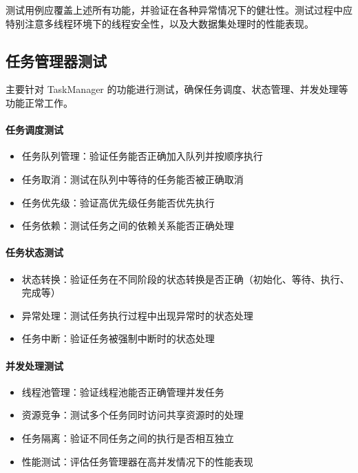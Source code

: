 \documentclass[a4paper,12pt]{report}	%
\begin{document}
测试用例应覆盖上述所有功能，并验证在各种异常情况下的健壮性。测试过程中应特别注意多线程环境下的线程安全性，以及大数据集处理时的性能表现。

\subsection{任务管理器测试}

主要针对 TaskManager 的功能进行测试，确保任务调度、状态管理、并发处理等功能正常工作。

\paragraph{任务调度测试}
\begin{itemize}
    \item 任务队列管理：验证任务能否正确加入队列并按顺序执行
    \item 任务取消：测试在队列中等待的任务能否被正确取消
    \item 任务优先级：验证高优先级任务能否优先执行
    \item 任务依赖：测试任务之间的依赖关系能否正确处理
\end{itemize}

\paragraph{任务状态测试}
\begin{itemize}
    \item 状态转换：验证任务在不同阶段的状态转换是否正确（初始化、等待、执行、完成等）
    \item 异常处理：测试任务执行过程中出现异常时的状态处理
    \item 任务中断：验证任务被强制中断时的状态处理
\end{itemize}

\paragraph{并发处理测试}
\begin{itemize}
    \item 线程池管理：验证线程池能否正确管理并发任务
    \item 资源竞争：测试多个任务同时访问共享资源时的处理
    \item 任务隔离：验证不同任务之间的执行是否相互独立
    \item 性能测试：评估任务管理器在高并发情况下的性能表现
\end{itemize}
\end{document}
